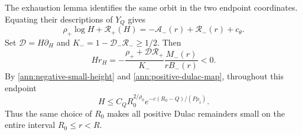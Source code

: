 The exhaustion lemma identifies the same orbit in the two endpoint
coordinates. Equating their descriptions of \(Y_Q\) gives
\begin{equation}\label{ann:endpoint-matching}
 \rho_+\log H+\mathcal R_+(H)
       =-\mathcal A_-(r)+\mathcal R_-(r)+c_\theta .
\end{equation}
Set \(\mathcal D=H\partial_H\) and
\(K_-=1-\mathcal D_-\mathcal R_-\ge1/2\).
Then
\begin{equation}\label{ann:rH}
 Hr_H=-\frac{\rho_++\mathcal D\mathcal R_+}{K_-}
                  \frac{M_-(r)}{rB_-(r)}<0 .
\end{equation}
By \eqref{ann:negative-small-height} and
\eqref{ann:positive-dulac-map}, throughout this endpoint
\[
 H\le C_QR_0^{2/\rho_0}e^{-c(R_0-Q)/(P\rho_1)}.
\]
Thus the same choice of \(R_0\) makes all positive Dulac remainders
small on the entire interval \(R_0\le r<R\).

